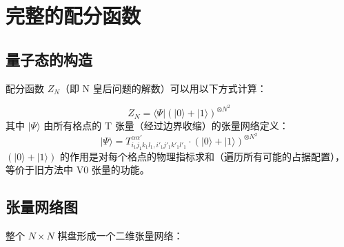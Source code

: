 \documentclass[12pt,a4paper]{article}
\begin{document}
\section{完整的配分函数}

\subsection{量子态的构造}

配分函数 $Z_N$（即 N 皇后问题的解数）可以用以下方式计算：

\begin{keybox}[配分函数]
\[
Z_N = \langle \Psi | \left( |0\rangle + |1\rangle \right)^{\otimes N^2}
\]
其中 $|\Psi\rangle$ 由所有格点的 T 张量（经过边界收缩）的张量网络定义：
\[
|\Psi\rangle = T^{\alpha\alpha'}_{i_1 j_1 k_1 l_1, i'_1 j'_1 k'_1 l'_1} \cdot \left( |0\rangle + |1\rangle \right)^{\otimes N^2}
\]
$\left( |0\rangle + |1\rangle \right)$ 的作用是对每个格点的物理指标求和（遍历所有可能的占据配置），等价于旧方法中 V0 张量的功能。
\end{keybox}

\subsection{张量网络图}

整个 $N \times N$ 棋盘形成一个二维张量网络：
\end{document}

